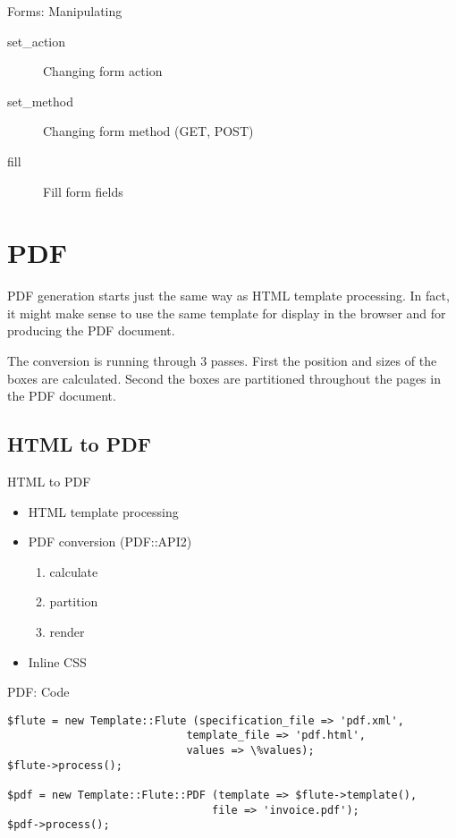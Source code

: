 \begin{frame}{Forms: Manipulating}
  \begin{description}
  \item[set\_action] Changing form action
  \item[set\_method] Changing form method (GET, POST)
  \item[fill] Fill form fields
  \end{description}
\end{frame}

\section{PDF}
PDF generation starts just the same way as HTML template
processing. In fact, it might make sense to use the same template
for display in the browser and for producing the PDF document.

The conversion is running through 3 passes. First the position
and sizes of the boxes are calculated. Second the boxes are
partitioned throughout the pages in the PDF document.

\subsection{HTML to PDF}
\begin{frame}{HTML to PDF}
  \begin{itemize}
  \item HTML template processing
  \item PDF conversion (PDF::API2)
    \begin{enumerate}
    \item calculate
    \item partition
    \item render
    \end{enumerate}
  \item Inline CSS 
  \end{itemize}
\end{frame}

\begin{frame}[fragile]{PDF: Code}
\begin{lstlisting}
$flute = new Template::Flute (specification_file => 'pdf.xml',
                            template_file => 'pdf.html',
                            values => \%values);
$flute->process();

$pdf = new Template::Flute::PDF (template => $flute->template(),
                                file => 'invoice.pdf');
$pdf->process();
\end{lstlisting}
\end{frame}

